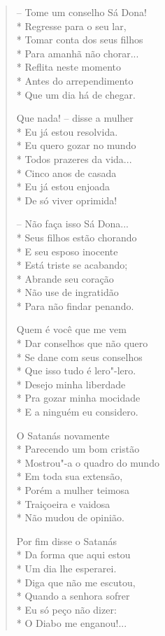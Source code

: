 \begin{verse}
--  Tome um conselho Sá Dona!\\*
Regresse para o seu lar,\\*
Tomar conta dos seus filhos\\*
Para amanhã não chorar...\\*
Reflita neste momento\\*
Antes do arrependimento\\*
Que um dia há de chegar.

Que nada! --  disse a mulher\\*
Eu já estou resolvida.\\*
Eu quero gozar no mundo\\*
Todos prazeres da vida...\\*
Cinco anos de casada\\*
Eu já estou enjoada\\*
De só viver oprimida!

--  Não faça isso Sá Dona...\\*
Seus filhos estão chorando\\*
E seu esposo inocente\\*
Está triste se acabando;\\*
Abrande seu coração\\*
Não use de ingratidão\\*
Para não findar penando.

Quem é você que me vem\\*
Dar conselhos que não quero\\*
Se dane com seus conselhos\\*
Que isso tudo é lero"-lero.\\*
Desejo minha liberdade\\*
Pra gozar minha mocidade\\*
E a ninguém eu considero.

O Satanás novamente\\*
Parecendo um bom cristão\\*
Mostrou"-a o quadro do mundo\\*
Em toda sua extensão,\\*
Porém a mulher teimosa\\*
Traiçoeira e vaidosa\\*
Não mudou de opinião.

Por fim disse o Satanás\\*
Da forma que aqui estou\\*
Um dia lhe esperarei.\\*
Diga que não me escutou,\\*
Quando a senhora sofrer\\*
Eu só peço não dizer:\\*
O Diabo me enganou!...


\end{verse}
